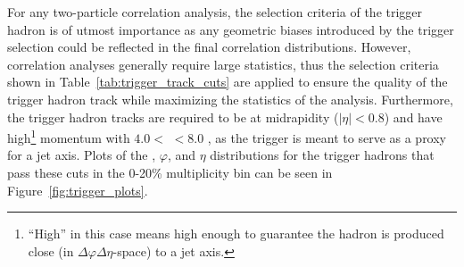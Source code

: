 For any two-particle correlation analysis, the selection criteria of the trigger hadron is of utmost importance as any geometric biases introduced by the trigger selection could be reflected in the final correlation distributions. However, correlation analyses generally require large statistics, thus the selection criteria shown in Table~\ref{tab:trigger_track_cuts} are applied to ensure the quality of the trigger hadron track while maximizing the statistics of the analysis. Furthermore, the trigger hadron tracks are required to be at midrapidity ($|\eta| < 0.8$) and have high\footnote{``High'' in this case means high enough to guarantee the hadron is produced close (in $\Delta\varphi\Delta\eta$-space) to a jet axis.} momentum with $4.0 <$ \pttrig $< 8.0$ \GeVc, as the trigger is meant to serve as a proxy for a jet axis. Plots of the \pt, $\varphi$, and $\eta$ distributions for the trigger hadrons that pass these cuts in the 0-20\% multiplicity bin can be seen in Figure~\ref{fig:trigger_plots}.


